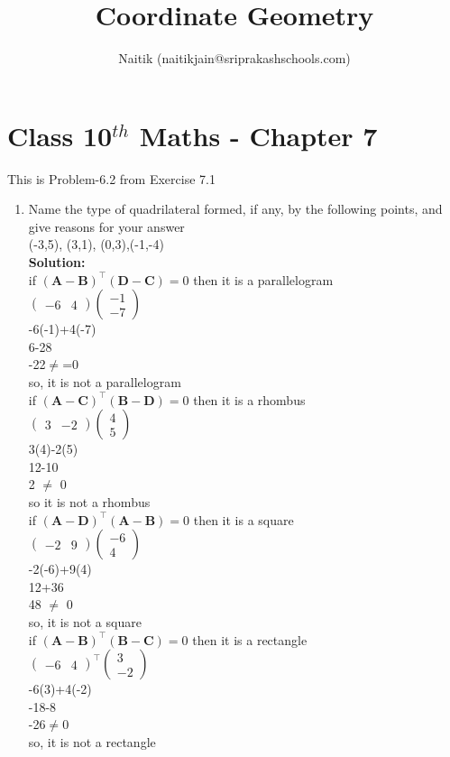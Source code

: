 \documentclass[10pt]{article}
\title{Coordinate Geometry}
\author{Naitik (naitikjain@sriprakashschools.com)}
\newcommand{\myvec}[1]{\ensuremath{\begin{pmatrix}#1\end{pmatrix}}}
\newcommand{\solution}{\noindent \textbf{Solution: }}
\providecommand{\brak}[1]{\ensuremath{\left(#1\right)}}
\let\vec\mathbf
\begin{document}
\maketitle
\section*{Class 10$^{th}$ Maths - Chapter 7}
This is Problem-6.2 from Exercise 7.1
\begin{enumerate}
\item Name the type of quadrilateral formed, if any, by the following points, and give reasons for your answer\\
(-3,5), (3,1), (0,3),(-1,-4)\\
\solution\\
if $\brak{\vec{A}-\vec{B}}^{\top}\brak{\vec{D}-\vec{C}}=0$ then it is a parallelogram\\
$\myvec{-6&4}\myvec{-1\\-7}$\\
-6(-1)+4(-7)\\
6-28\\
-22$\neq$=0\\
so, it is not a parallelogram\\
if $\brak{\vec{A}-\vec{C}}^{\top}\brak{\vec{B}-\vec{D}}=0$ then it is a rhombus\\
$\myvec{3&-2}{\myvec{4\\5}}$\\
3(4)-2(5)\\
12-10\\
2 $\neq$ 0\\
so it is not a rhombus\\
if $\brak{\vec{A}-\vec{D}}^{\top}\brak{\vec{A}-\vec{B}}=0$ then it is a square\\
$\myvec{-2&9}{\myvec{-6\\4}}$\\
-2(-6)+9(4)\\
12+36\\
48 $\neq$ 0\\
so, it is not a square\\
if $\brak{\vec{A}-\vec{B}}^{\top}\brak{\vec{B}-\vec{C}}=0$ then it is a rectangle\\
$\myvec{-6&4}^{\top}{\myvec{3\\-2}}$\\
-6(3)+4(-2)\\
-18-8\\
-26$\neq$0\\
so, it is not a rectangle\\ 
\end{enumerate}
\end{document}
